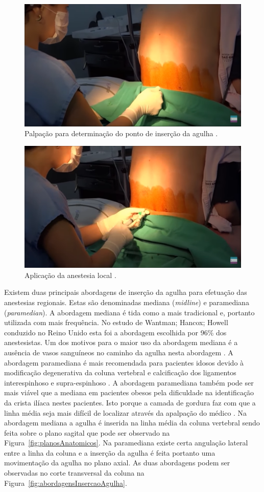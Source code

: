 \begin{figure}[ht!]
    \centering
    \includegraphics[width=0.6\linewidth]{capitulos/figuras/0.marcacaoPonto.png}
    \caption{Palpação para determinação do ponto de inserção da agulha \cite{Londero2018}.}
    \label{fig:marcacaoPonto}
\end{figure}

\begin{figure}[ht!]
    \centering
    \includegraphics[width=0.6\linewidth]{capitulos/figuras/1.AnestesiaLocal.png}
    \caption{Aplicação da anestesia local \cite{Londero2018}.}
    \label{fig:anestesiaLocal}
\end{figure}

Existem duas principais abordagens de inserção da agulha para efetuação das anestesias regionais. Estas são denominadas mediana (\textit{midline}) e paramediana (\textit{paramedian}). A abordagem mediana é tida como a mais tradicional e, portanto  utilizada com mais frequência. No estudo de Wantman; Hancox; Howell \cite{Wantman2006} conduzido no Reino Unido esta foi a abordagem escolhida por 96\% dos anestesistas. Um dos motivos para o maior uso da abordagem mediana é a ausência de vasos sanguíneos no caminho da agulha nesta abordagem \cite{Bapat2015}. A abordagem paramediana é mais recomendada para pacientes idosos \cite{Ahsan-ul-Haq2005} devido à modificação degenerativa da coluna vertebral \cite{Boon2003} e calcificação dos ligamentos interespinhoso e supra-espinhoso \cite{Wantman2006}. A abordagem paramediana também pode ser mais viável que a mediana em pacientes obesos pela dificuldade na identificação da crista ilíaca nestes pacientes. Isto porque a camada de gordura faz com que a linha média seja mais difícil de localizar através da apalpação do médico \cite{N.2013}. Na abordagem mediana a agulha é inserida na linha média da coluna vertebral sendo feita sobre o plano sagital que pode ser observado na Figura~\ref{fig:planosAnatomicos}. Na paramediana existe certa angulação lateral entre a linha da coluna e a inserção da agulha é feita portanto uma movimentação da agulha no plano axial. As duas abordagens podem ser observadas no corte transversal da coluna na Figura~\ref{fig:abordagensInsercaoAgulha}. 

